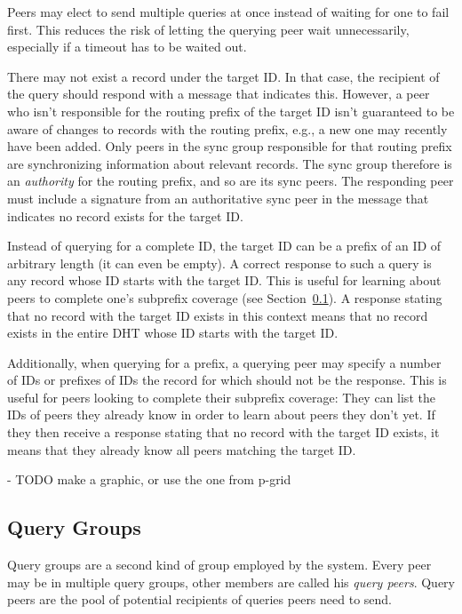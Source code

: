 Peers may elect to send multiple queries at once instead of waiting for one to
fail first. This reduces the risk of letting the querying peer wait
unnecessarily, especially if a timeout has to be waited out.

There may not exist a record under the target ID. In that case, the recipient of
the query should respond with a message that indicates this. However, a peer who
isn't responsible for the routing prefix of the target ID isn't guaranteed to be
aware of changes to records with the routing prefix, e.g., a new one may
recently have been added. Only peers in the sync group responsible for that
routing prefix are synchronizing information about relevant records. The sync
group therefore is an \emph{authority} for the routing prefix, and so are its
sync peers. The responding peer must include a signature from an authoritative
sync peer in the message that indicates no record exists for the target ID.

Instead of querying for a complete ID, the target ID can be a prefix of an ID of
arbitrary length (it can even be empty). A correct response to such a query is
any record whose ID starts with the target ID. This is useful for learning about
peers to complete one's subprefix coverage (see
Section~\ref{sec:desc_query_groups}). A response stating that no record with the
target ID exists in this context means that no record exists in the entire
\ac{DHT} whose ID starts with the target ID.

Additionally, when querying for a prefix, a querying peer may specify a number
of IDs or prefixes of IDs the record for which should not be the response. This
is useful for peers looking to complete their subprefix coverage: They can list
the IDs of peers they already know in order to learn about peers they don't yet.
If they then receive a response stating that no record with the target ID
exists, it means that they already know all peers matching the target ID.

- TODO make a graphic, or use the one from p-grid

\subsection{Query Groups}
\label{sec:desc_query_groups}
Query groups are a second kind of group employed by the system. Every peer may
be in multiple query groups, other members are called his \emph{query peers}.
Query peers are the pool of potential recipients of queries peers need to send.

